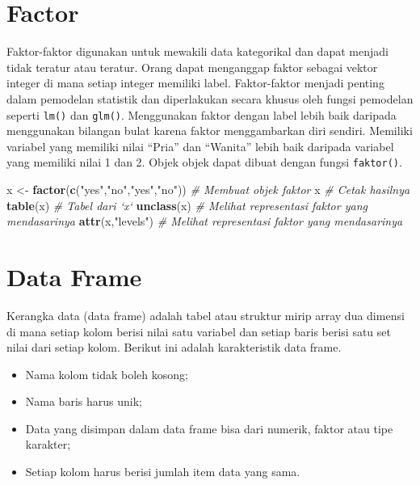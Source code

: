 \documentclass[
]{book}
\newenvironment{Shaded}{\begin{snugshade}}{\end{snugshade}}
\newcommand{\CommentTok}[1]{\textcolor[rgb]{0.56,0.35,0.01}{\textit{#1}}}
\newcommand{\KeywordTok}[1]{\textcolor[rgb]{0.13,0.29,0.53}{\textbf{#1}}}
\newcommand{\NormalTok}[1]{#1}
\newcommand{\StringTok}[1]{\textcolor[rgb]{0.31,0.60,0.02}{#1}}
\providecommand{\tightlist}{%
  \setlength{\itemsep}{0pt}\setlength{\parskip}{0pt}}
\begin{document}
\hypertarget{factor}{%
\section{Factor}\label{factor}}

Faktor-faktor digunakan untuk mewakili data kategorikal dan dapat menjadi tidak teratur atau teratur. Orang dapat menganggap faktor sebagai vektor integer di mana setiap integer memiliki label. Faktor-faktor menjadi penting dalam pemodelan statistik dan diperlakukan secara khusus oleh fungsi pemodelan seperti \texttt{lm()} dan \texttt{glm()}.
Menggunakan faktor dengan label lebih baik daripada menggunakan bilangan bulat karena faktor menggambarkan diri sendiri. Memiliki variabel yang memiliki nilai ``Pria'' dan ``Wanita'' lebih baik daripada variabel yang memiliki nilai 1 dan 2. Objek objek dapat dibuat dengan fungsi \texttt{faktor()}.

\begin{Shaded}
\begin{Highlighting}[]
\NormalTok{x <-}\StringTok{ }\KeywordTok{factor}\NormalTok{(}\KeywordTok{c}\NormalTok{(}\StringTok{"yes"}\NormalTok{,}\StringTok{"no"}\NormalTok{,}\StringTok{"yes"}\NormalTok{,}\StringTok{"no"}\NormalTok{))  }\CommentTok{# Membuat objek faktor}
\NormalTok{x                                      }\CommentTok{# Cetak hasilnya}
\KeywordTok{table}\NormalTok{(x)                               }\CommentTok{# Tabel dari `x`}
\KeywordTok{unclass}\NormalTok{(x)                             }\CommentTok{# Melihat representasi faktor yang mendasarinya}
\KeywordTok{attr}\NormalTok{(x,}\StringTok{"levels"}\NormalTok{)                       }\CommentTok{# Melihat representasi faktor yang mendasarinya}
\end{Highlighting}
\end{Shaded}

\hypertarget{data-frame}{%
\section{Data Frame}\label{data-frame}}

Kerangka data (data frame) adalah tabel atau struktur mirip array dua dimensi di mana setiap kolom berisi nilai satu variabel dan setiap baris berisi satu set nilai dari setiap kolom.
Berikut ini adalah karakteristik data frame.

\begin{itemize}
\tightlist
\item
  Nama kolom tidak boleh kosong;
\item
  Nama baris harus unik;
\item
  Data yang disimpan dalam data frame bisa dari numerik, faktor atau tipe karakter;
\item
  Setiap kolom harus berisi jumlah item data yang sama.
\end{itemize}
\end{document}
